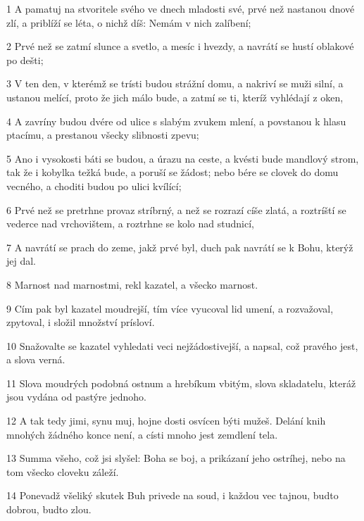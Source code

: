 \par 1 A pamatuj na stvoritele svého ve dnech mladosti své, prvé než nastanou dnové zlí, a priblíží se léta, o nichž díš: Nemám v nich zalíbení;
\par 2 Prvé než se zatmí slunce a svetlo, a mesíc i hvezdy, a navrátí se hustí oblakové po dešti;
\par 3 V ten den, v kterémž se trísti budou strážní domu, a nakriví se muži silní, a ustanou melící, proto že jich málo bude, a zatmí se ti, kteríž vyhlédají z oken,
\par 4 A zavríny budou dvére od ulice s slabým zvukem mlení, a povstanou k hlasu ptacímu, a prestanou všecky slibnosti zpevu;
\par 5 Ano i vysokosti báti se budou, a úrazu na ceste, a kvésti bude mandlový strom, tak že i kobylka težká bude, a poruší se žádost; nebo bére se clovek do domu vecného, a choditi budou po ulici kvílící;
\par 6 Prvé než se pretrhne provaz stríbrný, a než se rozrazí cíše zlatá, a roztríští se vederce nad vrchovištem, a roztrhne se kolo nad studnicí,
\par 7 A navrátí se prach do zeme, jakž prvé byl, duch pak navrátí se k Bohu, kterýž jej dal.
\par 8 Marnost nad marnostmi, rekl kazatel, a všecko marnost.
\par 9 Cím pak byl kazatel moudrejší, tím více vyucoval lid umení, a rozvažoval, zpytoval, i složil množství prísloví.
\par 10 Snažovalte se kazatel vyhledati veci nejžádostivejší, a napsal, což pravého jest, a slova verná.
\par 11 Slova moudrých podobná ostnum a hrebíkum vbitým, slova skladatelu, kteráž jsou vydána od pastýre jednoho.
\par 12 A tak tedy jimi, synu muj, hojne dosti osvícen býti mužeš. Delání knih mnohých žádného konce není, a císti mnoho jest zemdlení tela.
\par 13 Summa všeho, což jsi slyšel: Boha se boj, a prikázaní jeho ostríhej, nebo na tom všecko cloveku záleží.
\par 14 Ponevadž všeliký skutek Buh privede na soud, i každou vec tajnou, budto dobrou, budto zlou.

